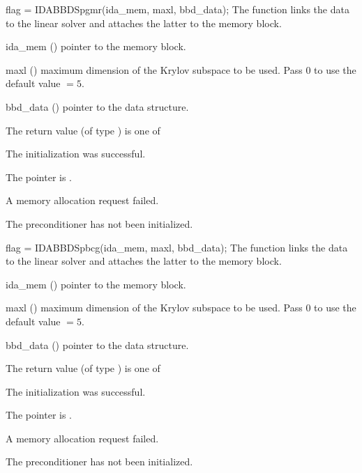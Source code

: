 {
  flag = IDABBDSpgmr(ida\_mem, maxl, bbd\_data);
}
{
  The function  links the {\idabbdpre} data to the
  {\idaspgmr} linear solver and attaches the latter to the {\ida}
  memory block.
}
{
  \begin{args}
  \item[ida\_mem] ()
    pointer to the {\ida} memory block.
  \item[maxl] ()
    maximum dimension of the Krylov subspace to be used. Pass $0$ to use the 
    default value $=5$.
  \item[bbd\_data] ()
    pointer to the {\idabbdpre} data structure.
  \end{args}
}
{
  The return value  (of type ) is one of
  \begin{args}
  \item[\Id{IDASPGMR\_SUCCESS}] 
    The {\idaspgmr} initialization was successful.
  \item[\Id{IDASPGMR\_MEM\_NULL}]
    The  pointer is .
  \item[\Id{IDASPGMR\_MEM\_FAIL}]
    A memory allocation request failed.
  \item[\Id{IDA\_PDATA\_NULL}]
    The {\idabbdpre} preconditioner has not been initialized.
  \end{args}
}
{}
{
  flag = IDABBDSpbcg(ida\_mem, maxl, bbd\_data);
}
{
  The function  links the {\idabbdpre} data to the
  {\idaspbcg} linear solver and attaches the latter to the {\ida}
  memory block.
}
{
  \begin{args}
  \item[ida\_mem] ()
    pointer to the {\ida} memory block.
  \item[maxl] ()
    maximum dimension of the Krylov subspace to be used. Pass $0$ to use the 
    default value $=5$.
  \item[bbd\_data] ()
    pointer to the {\idabbdpre} data structure.
  \end{args}
}
{
  The return value  (of type ) is one of
  \begin{args}
  \item[\Id{IDASPBCG\_SUCCESS}] 
    The {\idaspbcg} initialization was successful.
  \item[\Id{IDASPBCG\_MEM\_NULL}]
    The  pointer is .
  \item[\Id{IDASPBCG\_MEM\_FAIL}]
    A memory allocation request failed.
  \item[\Id{IDA\_PDATA\_NULL}]
    The {\idabbdpre} preconditioner has not been initialized.
  \end{args}
}
